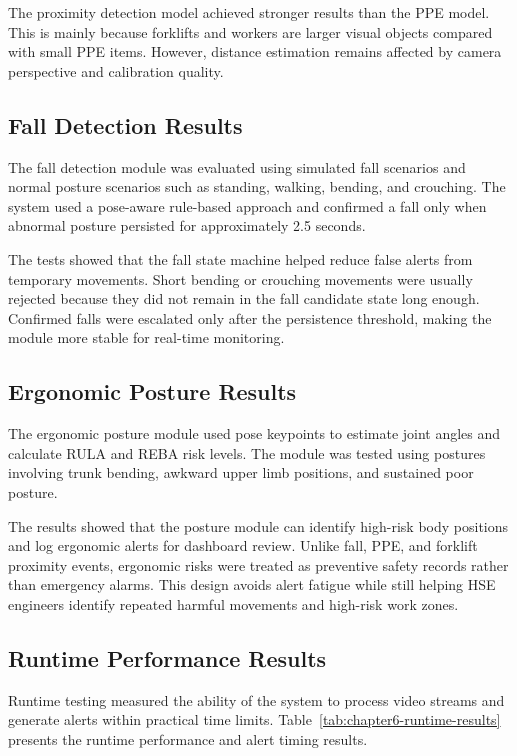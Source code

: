 The proximity detection model achieved stronger results than the PPE model. This is mainly because forklifts and workers are larger visual objects compared with small PPE items. However, distance estimation remains affected by camera perspective and calibration quality.

\subsection{Fall Detection Results}

The fall detection module was evaluated using simulated fall scenarios and normal posture scenarios such as standing, walking, bending, and crouching. The system used a pose-aware rule-based approach and confirmed a fall only when abnormal posture persisted for approximately 2.5 seconds.

The tests showed that the fall state machine helped reduce false alerts from temporary movements. Short bending or crouching movements were usually rejected because they did not remain in the fall candidate state long enough. Confirmed falls were escalated only after the persistence threshold, making the module more stable for real-time monitoring.

\subsection{Ergonomic Posture Results}

The ergonomic posture module used pose keypoints to estimate joint angles and calculate RULA and REBA risk levels. The module was tested using postures involving trunk bending, awkward upper limb positions, and sustained poor posture.

The results showed that the posture module can identify high-risk body positions and log ergonomic alerts for dashboard review. Unlike fall, PPE, and forklift proximity events, ergonomic risks were treated as preventive safety records rather than emergency alarms. This design avoids alert fatigue while still helping HSE engineers identify repeated harmful movements and high-risk work zones.

\subsection{Runtime Performance Results}

Runtime testing measured the ability of the system to process video streams and generate alerts within practical time limits. Table~\ref{tab:chapter6-runtime-results} presents the runtime performance and alert timing results.

